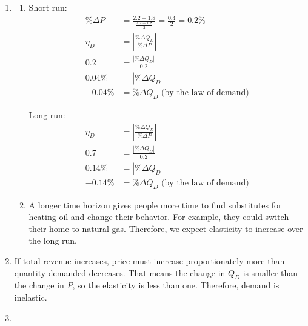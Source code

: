 \documentclass{article}
\begin{document}
\begin{enumerate}
\begin{enumerate}
\begin{enumerate}
		\end{enumerate}
		
	\item Flights are more of a necessity for business travelers and more of a luxury for vacationers, so we would expect vacationers to have more elastic demand.
	
	\end{enumerate}
	
\item

	\begin{enumerate}
	
	\item Short run:
	\begin{align*}
	\% \Delta P &= \frac{2.2 - 1.8}{\frac{2.2 + 1.8}{2}} = \frac{0.4}{2} = 0.2\% \\
	\eta_D &= \left| \frac{\% \Delta Q_D}{\% \Delta P} \right| \\
	0.2 &= \frac{| \% \Delta Q_D |}{0.2} \\
	0.04\% &= | \% \Delta Q_D | \\
	-0.04\% &= \% \Delta Q_D \text{ (by the law of demand)}
	\end{align*}
	
	Long run:
	\begin{align*}
	\eta_D &= \left| \frac{\% \Delta Q_D}{\% \Delta P} \right| \\
	0.7 &= \frac{| \% \Delta Q_D |}{0.2} \\
	0.14\% &= | \% \Delta Q_D | \\
	-0.14\% &= \% \Delta Q_D \text{ (by the law of demand)}
	\end{align*}
	
	\item A longer time horizon gives people more time to find substitutes for heating oil and change their behavior. For example, they could switch their home to natural gas. Therefore, we expect elasticity to increase over the long run.
	
	\end{enumerate}
	
\item If total revenue increases, price must increase proportionately more than quantity demanded decreases. That means the change in $Q_D$ is smaller than the change in $P$, so the elasticity is less than one. Therefore, demand is inelastic.

\item

	\begin{enumerate}
	

\end{enumerate}
\end{enumerate}
\end{document}

